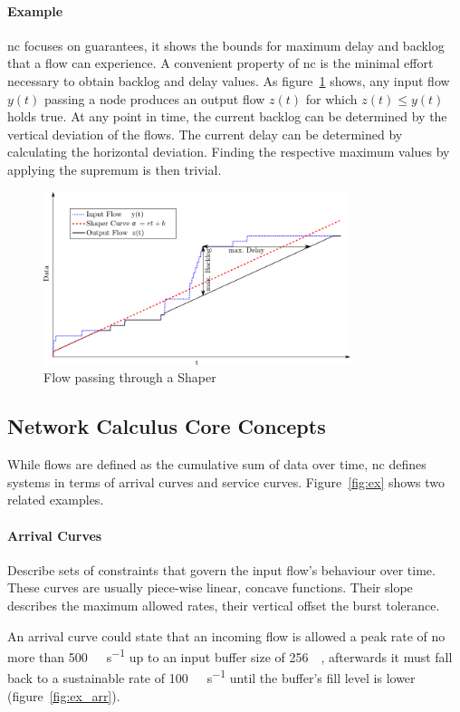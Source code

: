 \paragraph{Example}
\gls{nc} focuses on guarantees, it shows the bounds for maximum delay and backlog that a flow can experience.
A convenient property of \gls{nc} is the minimal effort necessary to obtain backlog and delay values.
As figure~\ref{fig:nc_basics1} shows, any input flow $y(t)$ passing a node produces an output flow $z(t)$ for which  $z(t) \le y(t)$ holds true.
At any point in time, the current backlog can be determined by the vertical deviation of the flows.
The current delay can be determined by calculating the horizontal deviation.
Finding the respective maximum values by applying the supremum is then trivial.
%
\begin{figure}[H]
  \centering
  \includegraphics*[width=0.8\textwidth,height=\textheight,keepaspectratio]{Figures/nc_basics1}
  \caption{Flow passing through a Shaper}
  \label{fig:nc_basics1}
\end{figure}
%
\subsection{Network Calculus Core Concepts}
%
While flows are defined as the cumulative sum of data over time, \gls{nc} defines systems in terms of arrival curves and service curves. Figure~\ref{fig:ex} shows two related examples.
\paragraph{Arrival Curves} Describe sets of constraints that govern the input flow's behaviour over time. 
These curves are usually piece-wise linear, concave functions. Their slope describes the maximum allowed rates, their vertical offset the burst tolerance. 
\par
An arrival curve could state that an incoming flow is allowed a peak rate of no more than \SI{500}{\mega\bit\per\second} up to an input buffer size of \SI{256}{\mega\byte},
afterwards it must fall back to a sustainable rate of \SI{100}{\mega\bit\per\second} until the buffer's fill level is lower (figure~\ref{fig:ex_arr}).
